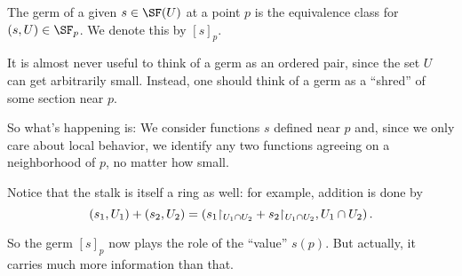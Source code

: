 \documentclass[11pt]{scrreprt}
\begin{document}
\begin{definition}
	The germ of a given $s \in \SF(U)$ at a point $p$
	is the equivalence class for $(s,U) \in \SF_p$.
	We denote this by $[s]_p$.
\end{definition}

\begin{remark}
	It is almost never useful to think of a germ as an ordered pair,
	since the set $U$ can get arbitrarily small.
	Instead, one should think of a germ as a
	``shred'' of some section near $p$.
\end{remark}

So what's happening is: We consider functions $s$ defined near $p$
and, since we only care about local behavior,
we identify any two functions agreeing on a neighborhood of $p$,
no matter how small.

Notice that the stalk is itself a ring as well:
for example, addition is done by
\[ 
	\left( s_1, U_1 \right) + \left( s_2, U_2 \right)
	=
	\left( s_1 \restrict{U_1 \cap U_2} + s_2 \restrict{U_1 \cap U_2},
	U_1 \cap U_2 \right).
\]

So the germ $[s]_p$ now plays the role of the ``value'' $s(p)$.
But actually, it carries much more information than that.
\end{document}
